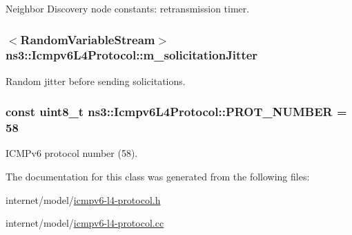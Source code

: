 Neighbor Discovery node constants\+: retransmission timer. 

\subsubsection[{\texorpdfstring{m\+\_\+solicitation\+Jitter}{m_solicitationJitter}}]{$<${\bf Random\+Variable\+Stream}$>$ ns3\+::\+Icmpv6\+L4\+Protocol\+::m\+\_\+solicitation\+Jitter\hspace{0.3cm}{\ttfamily [private]}}\hypertarget{classns3_1_1Icmpv6L4Protocol_ac7e4a25978a861e34cef7bdd27efb1d9}{}\label{classns3_1_1Icmpv6L4Protocol_ac7e4a25978a861e34cef7bdd27efb1d9}


Random jitter before sending solicitations. 

\subsubsection[{\texorpdfstring{P\+R\+O\+T\+\_\+\+N\+U\+M\+B\+ER}{PROT_NUMBER}}]{\setlength{\rightskip}{0pt plus 5cm}const uint8\+\_\+t ns3\+::\+Icmpv6\+L4\+Protocol\+::\+P\+R\+O\+T\+\_\+\+N\+U\+M\+B\+ER = 58\hspace{0.3cm}{\ttfamily [static]}}\hypertarget{classns3_1_1Icmpv6L4Protocol_aa56c41a886a45b8b4f22a19afc827e2d}{}\label{classns3_1_1Icmpv6L4Protocol_aa56c41a886a45b8b4f22a19afc827e2d}


I\+C\+M\+Pv6 protocol number (58). 



The documentation for this class was generated from the following files\+:\begin{DoxyCompactItemize}
\item 
internet/model/\hyperlink{icmpv6-l4-protocol_8h}{icmpv6-\/l4-\/protocol.\+h}\item 
internet/model/\hyperlink{icmpv6-l4-protocol_8cc}{icmpv6-\/l4-\/protocol.\+cc}\end{DoxyCompactItemize}
